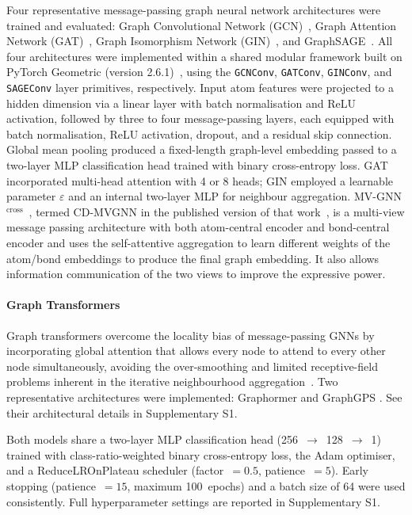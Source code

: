 \documentclass[letterpaper]{article}
\begin{document}
Four representative message-passing graph neural network architectures were trained and evaluated: Graph Convolutional Network (GCN)~\cite{kipf2016semi}, Graph Attention Network (GAT)~\cite{velivckovic2017graph}, Graph Isomorphism Network (GIN)~\cite{xu2018powerful}, and GraphSAGE~\cite{hamilton2017inductive}. All four architectures were implemented within a shared modular framework built on PyTorch Geometric (version 2.6.1)~\cite{fey2019fast}, using the \texttt{GCNConv}, \texttt{GATConv}, \texttt{GINConv}, and \texttt{SAGEConv} layer primitives, respectively. Input atom features were projected to a hidden dimension via a linear layer with batch normalisation and ReLU activation, followed by three to four message-passing layers, each equipped with batch normalisation, ReLU activation, dropout, and a residual skip connection. Global mean pooling produced a fixed-length graph-level embedding passed to a two-layer MLP classification head trained with binary cross-entropy loss. GAT incorporated multi-head attention with 4 or 8 heads; GIN employed a learnable parameter $\varepsilon$ and an internal two-layer MLP for neighbour aggregation. MV-GNN$^{\text{cross}}$~\cite{ma2020multiview}, termed CD-MVGNN in the published version of that work~\cite{ma2022cross}, is a multi-view message passing architecture with both atom-central encoder and bond-central encoder and uses the self-attentive aggregation to learn different weights of the atom/bond embeddings to produce the final graph embedding. It also allows information communication of the two views to improve the expressive power.

\paragraph{Graph Transformers}

Graph transformers overcome the locality bias of message-passing GNNs by incorporating global attention that allows every node to attend to every other node simultaneously, avoiding the over-smoothing and limited receptive-field problems inherent in the iterative neighbourhood aggregation~\cite{muller2023attending}. Two representative architectures were implemented: Graphormer \cite{ying2021transformers} and GraphGPS \cite{rampavsek2022recipe}. See their architectural details in Supplementary S1.%

Both models share a two-layer MLP classification head (256~$\to$~128~$\to$~1) trained with class-ratio-weighted binary cross-entropy loss, the Adam optimiser, and a ReduceLROnPlateau scheduler (factor~$=0.5$, patience~$=5$). Early stopping (patience~$=15$, maximum 100~epochs) and a batch size of 64 were used consistently. Full hyperparameter settings are reported in Supplementary S1.%
\end{document}
